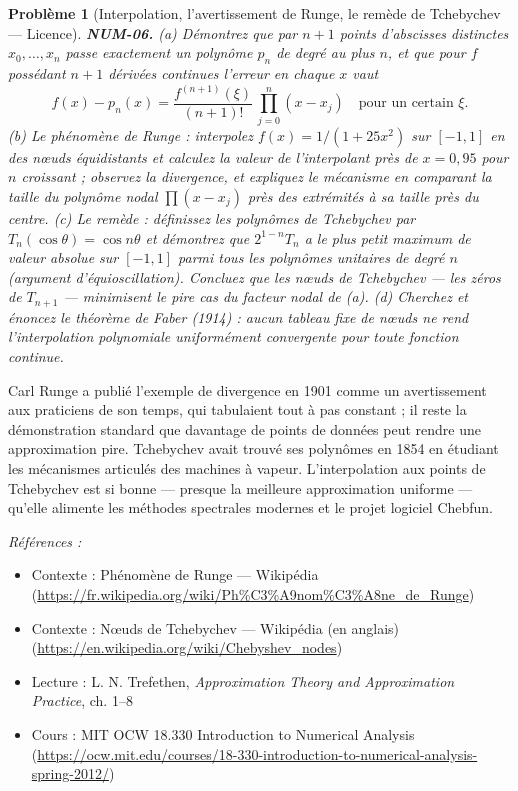 \documentclass[11pt]{article}
\newtheorem{problem}{Problème}
\newenvironment{refs}{\par\small\noindent\emph{Références :}\begin{itemize}\setlength\itemsep{0pt}}{\end{itemize}\normalsize}
\begin{document}
\begin{problem}[{Interpolation, l'avertissement de Runge, le remède de Tchebychev --- Licence}]
\textbf{NUM-06.} (a) Démontrez que par $n+1$ points d'abscisses
distinctes $x_0, \ldots, x_n$ passe exactement un polynôme
$p_n$ de degré au plus $n$, et que pour $f$ possédant $n+1$ dérivées
continues l'erreur en chaque $x$ vaut
\[ f(x) - p_n(x) = \frac{f^{(n+1)}(\xi)}{(n+1)!}\,\prod_{j=0}^{n}(x - x_j)
\quad\text{pour un certain } \xi. \]
(b) Le phénomène de Runge : interpolez $f(x) = 1/(1 + 25x^2)$ sur $[-1,1]$ en des
n\oe{}uds équidistants et calculez la valeur de l'interpolant près de $x = 0{,}95$ pour
$n$ croissant ; observez la divergence, et expliquez le mécanisme en comparant la
taille du polynôme nodal $\prod (x - x_j)$ près des extrémités à sa taille
près du centre. (c) Le remède : définissez les polynômes de Tchebychev par
$T_n(\cos\theta) = \cos n\theta$ et démontrez que $2^{1-n}T_n$ a le plus petit
maximum de valeur absolue sur $[-1,1]$ parmi tous les polynômes unitaires de degré
$n$ (argument d'équioscillation). Concluez que les n\oe{}uds de Tchebychev --- les zéros
de $T_{n+1}$ --- minimisent le pire cas du facteur nodal de (a).
(d) Cherchez et énoncez le théorème de Faber (1914) : aucun tableau fixe de n\oe{}uds ne
rend l'interpolation polynomiale uniformément convergente pour toute fonction
continue.
\end{problem}

\noindent Carl Runge a publié l'exemple de divergence en 1901 comme un
avertissement aux praticiens de son temps, qui tabulaient tout à pas constant ; il
reste la démonstration standard que \og{} davantage de points de données \fg{} peut rendre une
approximation pire. Tchebychev avait trouvé ses polynômes en 1854 en étudiant les
mécanismes articulés des machines à vapeur. L'interpolation aux points de Tchebychev
est si bonne --- presque la meilleure approximation uniforme --- qu'elle alimente les
méthodes spectrales modernes et le projet logiciel Chebfun.

\begin{refs}
\item Contexte : Phénomène de Runge --- Wikipédia (\url{https://fr.wikipedia.org/wiki/Ph%C3%A9nom%C3%A8ne_de_Runge})
\item Contexte : N\oe{}uds de Tchebychev --- Wikipédia (en anglais) (\url{https://en.wikipedia.org/wiki/Chebyshev_nodes})
\item Lecture : L. N. Trefethen, \textit{Approximation Theory and Approximation Practice}, ch. 1--8
\item Cours : MIT OCW 18.330 Introduction to Numerical Analysis (\url{https://ocw.mit.edu/courses/18-330-introduction-to-numerical-analysis-spring-2012/})
\end{refs}
\end{document}

